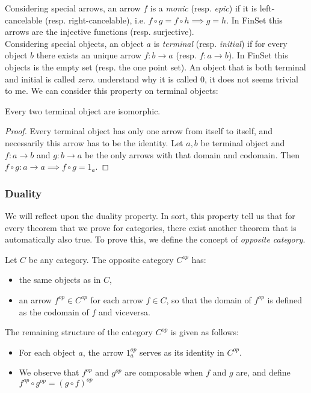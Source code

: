 Considering special arrows, an arrow $f$ is a \emph{monic} (resp. \emph{epic}) if it is left-cancelable (resp. right-cancelable), i.e.  $f\circ g = f \circ h \implies g = h$. In FinSet this arrows are the injective functions (resp. surjective).\\


 
Considering special objects, an object $a$ is \emph{terminal} (resp. \emph{initial}) if for every object $b$ there exists an unique arrow $f:b\to a$ (resp. $f:a\to b$). In FinSet this objects is the empty set (resp. the one point set). An object that is both terminal and initial is called \emph{zero}. {\color{red} understand why it is called 0, it does not seems trivial to me}. We can consider this property on terminal objects:

\begin{proposition}\label{terminal-proposition}
  Every two terminal object are isomorphic.
\end{proposition}
\begin{proof}
 Every terminal object has only one arrow from itself to itself, and necessarily this arrow has to be the identity. Let $a, b$ be terminal object and $f:a\to b$ and $g:b\to a$ be the only arrows with that domain and codomain. Then $f\circ g : a \to a \implies f \circ g = 1_a$.
\end{proof}

\subsubsection{Duality}
We will reflect upon the duality property. In sort, this property tell us that for every theorem that we prove for categories, there exist another theorem that is automatically also true. To prove this, we define the concept of \emph{opposite category}.\\


\begin{definition}
  Let $C$ be any category. The opposite category $C^{op}$ has:
  \begin{itemize}
  \item the same objects as in $C$,
  \item an arrow $f^{op}\in C^{op}$ for each arrow $f \in C$, so that the domain of $f^{op}$ is defined as the codomain of $f$ and viceversa.
  \end{itemize}
  The remaining structure of the category $C^{op}$ is given as follows:
  \begin{itemize}
  \item For each object $a$, the arrow $1_a^{op}$ serves as its identity in $C^{op}$.
  \item We observe that $f^{op}$ and $g^{op}$ are composable when $f$ and $g$ are, and define $f^{op} \circ g^{op} = (g \circ f)^{op}$
  \end{itemize}
\end{definition}


